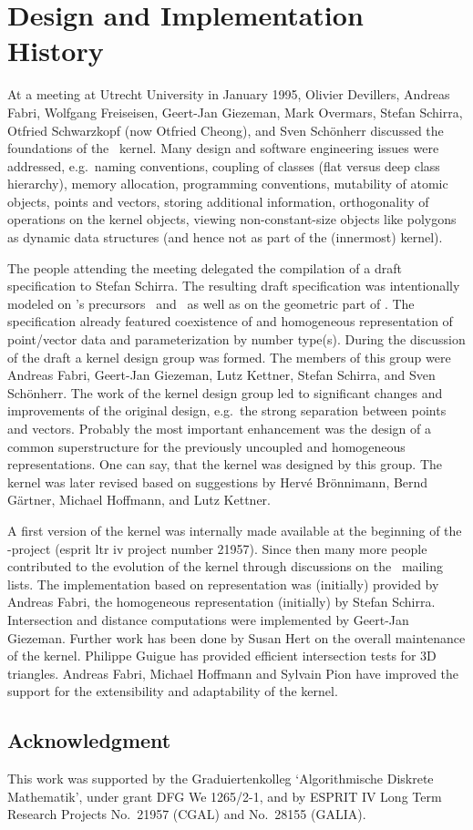 \section{Design and Implementation History}

At a meeting at Utrecht University in January 1995,
Olivier Devillers, Andreas Fabri, Wolfgang Freiseisen,
Geert-Jan Giezeman, Mark Overmars, Stefan Schirra, Otfried Schwarzkopf
(now Otfried Cheong), and Sven Sch\"onherr
discussed the foundations of the \cgal\ kernel.
Many design and software engineering issues were addressed, 
e.g.\ naming conventions, coupling of classes 
(flat versus deep class hierarchy), 
memory allocation, programming conventions, mutability of 
atomic objects, points and vectors, storing additional information, 
orthogonality of operations on the kernel objects,
viewing non-constant-size objects like polygons as 
dynamic data structures (and hence not as part of the (innermost) kernel).

The people attending the meeting delegated the compilation of 
a draft specification to Stefan Schirra.
The resulting draft specification was intentionally modeled on \cgal's 
precursors \protocgal\ and \plageo\ as well as on the geometric part of \leda.
The specification already featured coexistence of 
 and 
homogeneous representation of point/vector data and parameterization 
by number type(s).
During the discussion of the draft a kernel design group was formed. 
The members of this group were Andreas Fabri, Geert-Jan Giezeman,
Lutz Kettner, Stefan Schirra, and Sven Sch\"onherr.
The work of the kernel design group led to significant changes and
improvements of the original design, e.g.\ the strong separation between
points and vectors. Probably the most important enhancement was the design 
of a common superstructure for the previously uncoupled 
 and
homogeneous representations. One can say, that the kernel was designed
by this group.
The kernel was later revised based on suggestions by Herv\'e Br\"onnimann,
Bernd G\"artner, Michael Hoffmann, and Lutz Kettner.

A first version of the kernel was internally made available at the beginning
of the \cgal-project ({\sc esprit ltr iv} project number 21957).
Since then many more people contributed to the evolution of the kernel
through discussions on the \cgal\ mailing lists.
The implementation based on 
 representation was (initially) provided 
by Andreas Fabri, the homogeneous representation (initially) by Stefan Schirra.
Intersection and distance computations were implemented by Geert-Jan Giezeman.
Further work has been done by Susan Hert on the overall maintenance of the
kernel.
Philippe Guigue has provided efficient intersection tests for 3D triangles.
Andreas Fabri, Michael Hoffmann and Sylvain Pion have improved the support for
the extensibility and adaptability of the kernel.

\subsection{Acknowledgment}

This work was supported
by the Graduiertenkolleg `Algorithmische Diskrete Mathematik',
under grant DFG We 1265/2-1,
and by ESPRIT IV Long Term Research Projects No.~21957 (CGAL)
and No.~28155 (GALIA).

